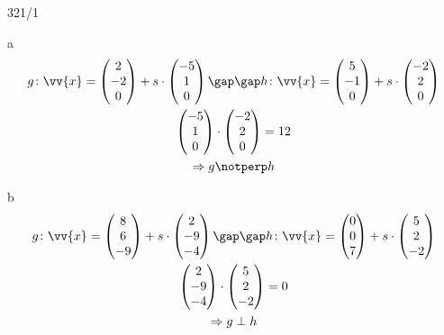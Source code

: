 \begin{exercise}{321/1}
  \item [a]
  \begin{gather*}
    g \colon \vv{x} = \begin{pmatrix}2 \\ -2 \\ 0\end{pmatrix} + s \cdot \begin{pmatrix}-5 \\ 1 \\ 0\end{pmatrix} \gap\gap h \colon \vv{x} = \begin{pmatrix}5 \\ -1 \\ 0\end{pmatrix} + s \cdot \begin{pmatrix}-2 \\ 2 \\ 0\end{pmatrix} \\
    \begin{pmatrix}-5 \\ 1 \\ 0\end{pmatrix} \cdot \begin{pmatrix}-2 \\ 2 \\ 0\end{pmatrix} = 12 \\
    \Rightarrow g \notperp h
  \end{gather*}
  \item [b]
  \begin{gather*}
    g \colon \vv{x} = \begin{pmatrix}8 \\ 6 \\ -9\end{pmatrix} + s \cdot \begin{pmatrix}2 \\ -9 \\ -4\end{pmatrix} \gap\gap h \colon \vv{x} = \begin{pmatrix}0 \\ 0 \\ 7\end{pmatrix} + s \cdot \begin{pmatrix}5 \\ 2 \\ -2\end{pmatrix} \\
    \begin{pmatrix}2 \\ -9 \\ -4\end{pmatrix} \cdot \begin{pmatrix}5 \\ 2 \\ -2\end{pmatrix} = 0 \\
    \Rightarrow g \perp h
  \end{gather*}
\end{exercise}
